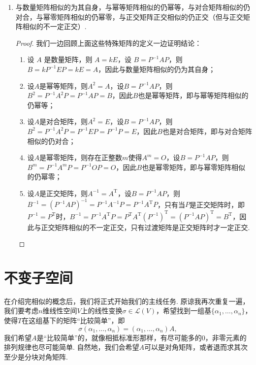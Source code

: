 \begin{enumerate}
    \item 与数量矩阵相似的为其自身，与幂等矩阵相似的仍幂等，与对合矩阵相似的仍对合，与幂零矩阵相似的仍幂零，与正交矩阵正交相似的仍正交（但与正交矩阵相似的不一定正交）.

          \begin{proof}
              我们一边回顾上面这些特殊矩阵的定义一边证明结论：
              \begin{enumerate}
                  \item 设 $A$ 是数量矩阵，则 $A = kE$，设 $B = P^{-1}AP$，则 $B = kP^{-1}EP = kE = A$，因此与数量矩阵相似的仍为其自身；
                  \item 设$A$是幂等矩阵，则$A^2=A$，设$B=P^{-1}AP$，则$B^2=P^{-1}A^2P=P^{-1}AP=B$，因此$B$也是幂等矩阵，即与幂等矩阵相似的仍幂等；

                  \item 设$A$是对合矩阵，则$A^2=E$，设$B=P^{-1}AP$，则$B^2=P^{-1}A^2P=P^{-1}EP=P^{-1}P=E$，因此$B$也是对合矩阵，即与对合矩阵相似的仍对合；

                  \item 设$A$是幂零矩阵，则存在正整数$m$使得$A^m=O$，设$B=P^{-1}AP$，则$B^m=P^{-1}A^mP=P^{-1}OP=O$，因此$B$也是幂零矩阵，即与幂零矩阵相似的仍幂零；

                  \item 设$A$是正交矩阵，则$A^{-1}=A^\mathrm{T}$，设$B=P^{-1}AP$，则$B^{-1}=(P^{-1}AP)^{-1}=P^{-1}A^{-1}P=P^{-1}A^\mathrm{T}P$，只有当$P$是正交矩阵时，即$P^{-1}=P^\mathrm{T}$时，$B^{-1}=P^{-1}A^\mathrm{T}P=P^\mathrm{T}A^\mathrm{T}(P^{-1})^\mathrm{T}=(P^{-1}AP)^\mathrm{T}=B^\mathrm{T}$，因此与正交矩阵相似的不一定正交，只有过渡矩阵是正交矩阵时才一定正交.
              \end{enumerate}
          \end{proof}
\end{enumerate}

\section{不变子空间}

在介绍完相似的概念后，我们将正式开始我们的主线任务. 原谅我再次重复一遍，我们要考虑$n$维线性空间$V$上的线性变换$\sigma\in\mathcal{L}(V)$，希望找到一组基$\{\alpha_1,\ldots,\alpha_n\}$，使得$T$在这组基下的矩阵``比较简单''，即
\[\sigma(\alpha_1,\ldots,\alpha_n)=(\alpha_1,\ldots,\alpha_n)A,\]
我们希望$A$是``比较简单''的，就像相抵标准形那样，有尽可能多的$0$，非零元素的排列规律也尽可能简单. 自然地，我们会希望$A$可以是对角矩阵，或者退而求其次至少是分块对角矩阵.

